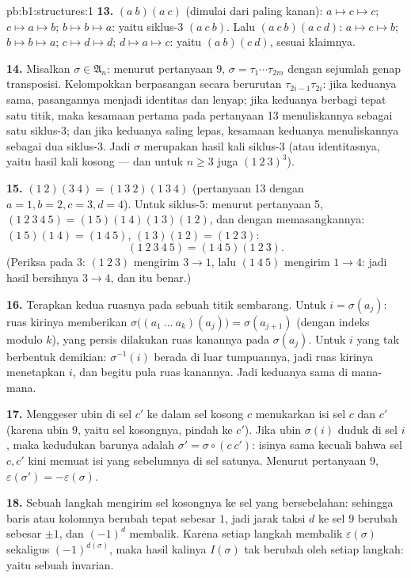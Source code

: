 \begin{solution}{pb:b1:structures:1}
\textbf{13.} $(a\ b)(a\ c)$ (dimulai dari paling kanan): $a \mapsto c
\mapsto c$; $c \mapsto a \mapsto b$; $b \mapsto b \mapsto a$:
yaitu siklus-$3$ $(a\ c\ b)$. Lalu $(a\ c\ b)(a\ c\ d)$: $a \mapsto c
\mapsto b$; $b \mapsto b \mapsto a$; $c \mapsto d \mapsto d$; $d
\mapsto a \mapsto c$: yaitu $(a\ b)(c\ d)$, sesuai klaimnya.

\textbf{14.} Misalkan $\sigma \in \mathfrak A_n$: menurut pertanyaan 9,
$\sigma = \tau_1\cdots\tau_{2m}$ dengan sejumlah genap
transposisi. Kelompokkan berpasangan secara berurutan
$\tau_{2i-1}\tau_{2i}$: jika keduanya sama, pasangannya menjadi
identitas dan lenyap; jika keduanya berbagi tepat satu titik, maka
kesamaan pertama pada pertanyaan 13 menuliskannya sebagai satu siklus-$3$;
dan jika keduanya saling lepas, kesamaan keduanya menuliskannya sebagai dua
siklus-$3$. Jadi $\sigma$ merupakan hasil kali siklus-$3$ (atau
identitasnya, yaitu hasil kali kosong --- dan untuk $n \geq 3$ juga $(1\ 2\
3)^3$).

\textbf{15.} $(1\ 2)(3\ 4) = (1\ 3\ 2)(1\ 3\ 4)$ (pertanyaan 13
dengan $a{=}1, b{=}2, c{=}3, d{=}4$). Untuk siklus-$5$: menurut
pertanyaan 5, $(1\ 2\ 3\ 4\ 5) = (1\ 5)(1\ 4)(1\ 3)(1\ 2)$, dan dengan
memasangkannya: $(1\ 5)(1\ 4) = (1\ 4\ 5)$, $(1\ 3)(1\ 2) = (1\ 2\ 3)$:
\[
(1\ 2\ 3\ 4\ 5) = (1\ 4\ 5)(1\ 2\ 3) .
\]
(Periksa pada $3$: $(1\ 2\ 3)$ mengirim $3 \to 1$, lalu $(1\ 4\ 5)$
mengirim $1 \to 4$: jadi hasil bersihnya $3 \to 4$, dan itu benar.)

\textbf{16.} Terapkan kedua ruasnya pada sebuah titik sembarang. Untuk $i =
\sigma(a_j)$: ruas kirinya memberikan $\sigma\bigl((a_1\ \dots\
a_k)(a_j)\bigr) = \sigma(a_{j+1})$ (dengan indeks modulo $k$), yang persis
dilakukan ruas kanannya pada $\sigma(a_j)$. Untuk $i$ yang tak berbentuk
demikian: $\sigma^{-1}(i)$ berada di luar tumpuannya, jadi ruas kirinya
menetapkan $i$, dan begitu pula ruas kanannya. Jadi keduanya sama di mana-mana.

\textbf{17.} Menggeser ubin di sel $c'$ ke dalam sel kosong
$c$ menukarkan isi sel $c$ dan $c'$ (karena ubin $9$, yaitu
sel kosongnya, pindah ke $c'$). Jika ubin $\sigma(i)$ duduk di sel $i$, maka
kedudukan barunya adalah $\sigma' = \sigma \circ (c\ c')$: isinya sama
kecuali bahwa sel $c, c'$ kini memuat isi yang sebelumnya di sel satunya. Menurut
pertanyaan 9, $\varepsilon(\sigma') = -\varepsilon(\sigma)$.

\textbf{18.} Sebuah langkah mengirim sel kosongnya ke sel yang bersebelahan: sehingga
baris atau kolomnya berubah tepat sebesar $1$, jadi jarak taksi
$d$ ke sel $9$ berubah sebesar $\pm1$, dan $(-1)^d$ membalik. Karena setiap
langkah membalik $\varepsilon(\sigma)$ sekaligus $(-1)^{d(\sigma)}$,
maka hasil kalinya $I(\sigma)$ tak berubah oleh setiap langkah: yaitu sebuah
invarian.


\end{solution}
